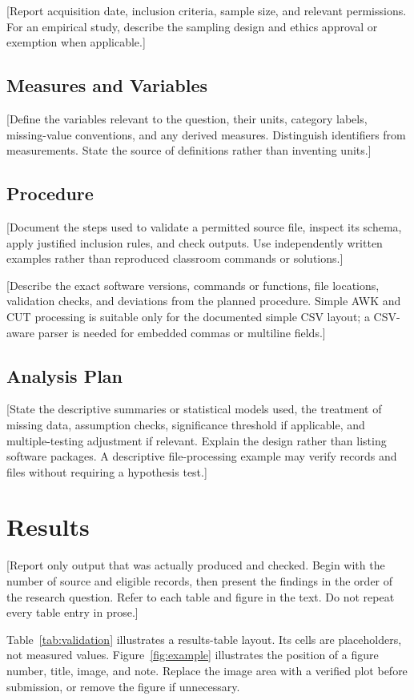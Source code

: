 \documentclass[12pt,letterpaper]{article}
\begin{document}
[Report acquisition date, inclusion criteria, sample size, and relevant
permissions. For an empirical study, describe the sampling design and ethics
approval or exemption when applicable.]

\subsection{Measures and Variables}
[Define the variables relevant to the question, their units, category labels,
missing-value conventions, and any derived measures. Distinguish identifiers
from measurements. State the source of definitions rather than inventing units.]

\subsection{Procedure}
[Document the steps used to validate a permitted source file, inspect its
schema, apply justified inclusion rules, and check outputs. Use independently
written examples rather than reproduced classroom commands or solutions.]

[Describe the exact software versions, commands or functions, file locations,
validation checks, and deviations from the planned procedure. Simple AWK and
CUT processing is suitable only for the documented simple CSV layout; a
CSV-aware parser is needed for embedded commas or multiline fields.]

\subsection{Analysis Plan}
[State the descriptive summaries or statistical models used, the treatment of
missing data, assumption checks, significance threshold if applicable, and
multiple-testing adjustment if relevant. Explain the design rather than
listing software packages. A descriptive file-processing example may verify records and files without
requiring a hypothesis test.]

\section{Results}
[Report only output that was actually produced and checked. Begin with the
number of source and eligible records, then present the findings in the order
of the research question. Refer to each table and figure in the text. Do not
repeat every table entry in prose.]

Table~\ref{tab:validation} illustrates a results-table layout. Its cells are
placeholders, not measured values. Figure~\ref{fig:example} illustrates the
position of a figure number, title, image, and note. Replace the image area
with a verified plot before submission, or remove the figure if unnecessary.
\end{document}
